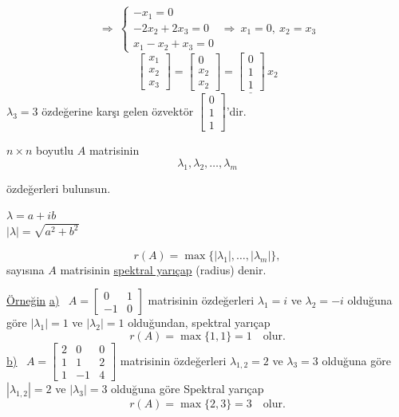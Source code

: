 \documentclass[11pt,a4paper]{article}
\begin{document}
\begin{cozum}
\[\]
\[
  \Rightarrow\ \begin{cases}-x_1=0\\-2x_2+2x_3=0\\x_1-x_2+x_3=0\end{cases}
  \ \Rightarrow\ x_1=0,\ x_2=x_3
\]
\[
  \begin{bmatrix}x_1\\x_2\\x_3\end{bmatrix}=\begin{bmatrix}0\\x_2\\x_2\end{bmatrix}
  =\underline{\begin{bmatrix}0\\1\\1\end{bmatrix}}\,x_2
\]
$\lambda_3=3$ özdeğerine karşı gelen özvektör $\begin{bmatrix}0\\1\\1\end{bmatrix}$'dir.

\end{cozum}

$n\times n$ boyutlu $A$ matrisinin
\[ \lambda_1,\lambda_2,\dots,\lambda_m \]
\noindent\begin{minipage}[b]{0.55\linewidth}
özdeğerleri bulunsun.
\end{minipage}\hfill
\begin{minipage}[b]{0.38\linewidth}
$\lambda=a+ib$\\[1mm]
$|\lambda|=\sqrt{a^2+b^2}$
\end{minipage}
\[ r(A)=\max\bigl\{|\lambda_1|,\dots,|\lambda_m|\bigr\}, \]
sayısına $A$ matrisinin \underline{spektral yarıçap} (radius) denir.

\medskip
\noindent\underline{\underline{Örneğin}} \quad \underline{a)} \ $A=\begin{bmatrix}0&1\\-1&0\end{bmatrix}$ matrisinin özdeğerleri
$\lambda_1=i$ ve $\lambda_2=-i$ olduğuna göre
$|\lambda_1|=1$ ve $|\lambda_2|=1$ olduğundan, spektral yarıçap
\[ r(A)=\max\{1,1\}=1 \quad\text{olur.} \]
\underline{\underline{b)}} \ $A=\begin{bmatrix}2&0&0\\1&1&2\\1&-1&4\end{bmatrix}$ matrisinin özdeğerleri $\lambda_{1,2}=2$ ve $\lambda_3=3$
olduğuna göre $|\lambda_{1,2}|=2$ ve $|\lambda_3|=3$ olduğuna göre Spektral yarıçap
\[ r(A)=\max\{2,3\}=3 \quad\text{olur.} \]
\end{document}
